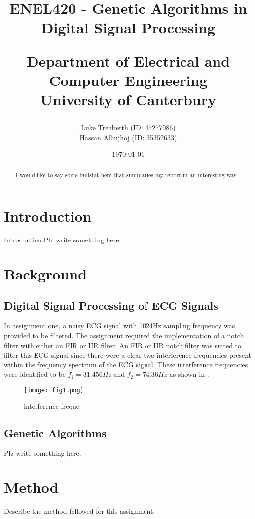 \documentclass[a4paper, 12pt]{article}
\title{
    ENEL420 - Genetic Algorithms in Digital Signal Processing\\
    \vspace{1cm}
    \begin{large} 
        Department of Electrical and Computer Engineering\\
        University of Canterbury\\
    \end{large}
    \vspace{1cm}
}
\author{
    \small {Luke Trenberth (ID: 47277086)}\\
    \small {Hassan Alhujhoj (ID: 35352633)}\\
    }
\date{\small\today}
\begin{document}
\maketitle

\begin{abstract}
    I would like to say some bullshit here that summaries my report in an interesting way.
\end{abstract}

\pagebreak
{}
\tableofcontents
{}
\pagebreak

\section{Introduction}\label{sec:intro}
    Introduction\cite{Ifeachor1995}.Plz write something here.

\section{Background}\label{sec:bg}
    \subsection{Digital Signal Processing of ECG Signals}\label{sec:bg_sub1}
        In assignment one, a noisy ECG signal with 1024Hz sampling frequency was provided to be filtered. 
        The assignment required the implementation of a notch filter with either an FIR or IIR filter.
        An FIR or IIR notch filter was suited to filter this ECG signal since there were a clear two 
        interference frequencies present within the frequency spectrum of the ECG signal.
        These interference frequencies were identified to be $f_{1} = 31.456Hz$ and $f_{2} = 74.36Hz$
        as shown in \label{fig1}.
        
        \begin{figure}[h]
            \centering
            \graphicspath{{./wiki/}}
            \texttt{[image: fig1.png]}
            \caption{interference freque}
            \label{Fig:my_label}
        \end{figure}

        
    \subsection{Genetic Algorithms}\label{sec:bg_sub2}
        Plz write something here.

\section{Method}\label{sec:meth}
    Describe the method followed for this assignment.
\end{document}
